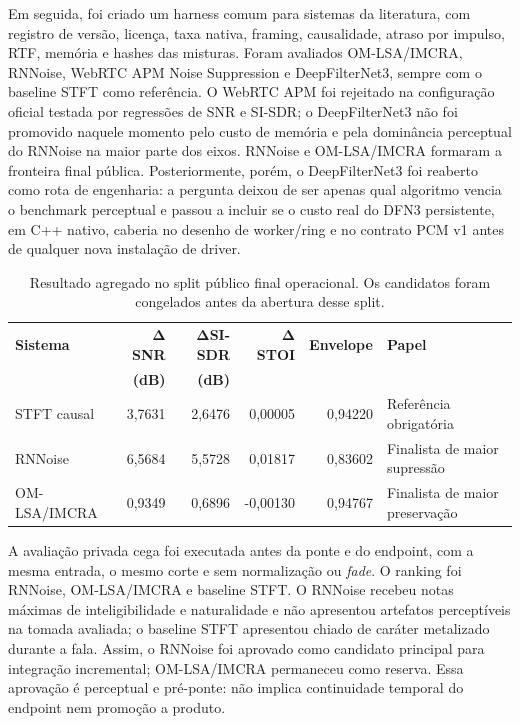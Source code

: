 Em seguida, foi criado um harness comum para sistemas da literatura, com registro de versão, licença, taxa nativa, framing, causalidade, atraso por impulso, RTF, memória e hashes das misturas. Foram avaliados OM-LSA/IMCRA, RNNoise, WebRTC APM Noise Suppression e DeepFilterNet3, sempre com o baseline STFT como referência. O WebRTC APM foi rejeitado na configuração oficial testada por regressões de SNR e SI-SDR; o DeepFilterNet3 não foi promovido naquele momento pelo custo de memória e pela dominância perceptual do RNNoise na maior parte dos eixos. RNNoise e OM-LSA/IMCRA formaram a fronteira final pública. Posteriormente, porém, o DeepFilterNet3 foi reaberto como rota de engenharia: a pergunta deixou de ser apenas qual algoritmo vencia o benchmark perceptual e passou a incluir se o custo real do DFN3 persistente, em C++ nativo, caberia no desenho de worker/ring e no contrato PCM v1 antes de qualquer nova instalação de driver.

\begin{table}[!htbp]
\centering
\caption[Resultado do split público final]{Resultado agregado no split público final operacional. Os candidatos foram congelados antes da abertura desse split.}
\label{tab:literatura-final}
\footnotesize
\begin{tabularx}{\textwidth}{XrrrrX}
\toprule
\textbf{Sistema} & \(\boldsymbol{\Delta}\)\textbf{SNR} & \(\boldsymbol{\Delta}\)\textbf{SI-SDR} & \(\boldsymbol{\Delta}\)\textbf{STOI} & \textbf{Envelope} & \textbf{Papel} \\
& \textbf{(dB)} & \textbf{(dB)} & & & \\
\midrule
STFT causal & 3,7631 & 2,6476 & 0,00005 & 0,94220 & Referência obrigatória \\
RNNoise & 6,5684 & 5,5728 & 0,01817 & 0,83602 & Finalista de maior supressão \\
OM-LSA/IMCRA & 0,9349 & 0,6896 & -0,00130 & 0,94767 & Finalista de maior preservação \\
\bottomrule
\end{tabularx}
\end{table}
\FloatBarrier

A avaliação privada cega foi executada antes da ponte e do endpoint, com a mesma entrada, o mesmo corte e sem normalização ou \textit{fade}. O ranking foi RNNoise, OM-LSA/IMCRA e baseline STFT. O RNNoise recebeu notas máximas de inteligibilidade e naturalidade e não apresentou artefatos perceptíveis na tomada avaliada; o baseline STFT apresentou chiado de caráter metalizado durante a fala. Assim, o RNNoise foi aprovado como candidato principal para integração incremental; OM-LSA/IMCRA permaneceu como reserva. Essa aprovação é perceptual e pré-ponte: não implica continuidade temporal do endpoint nem promoção a produto.

